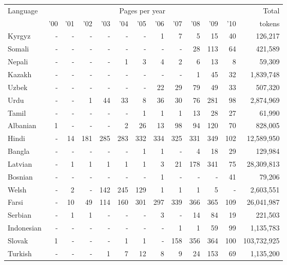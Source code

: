 \documentclass{article}
\begin{document}
\begin{table}[h!]
\setlength{\tabcolsep}{1ex}
\footnotesize
\begin{center}
\begin{tabular}{lrrrrrrrrrrrr}
Language		&	\multicolumn{11}{c}{Pages per year}	&	Total\\
\cline{2-12}
	&	'00	&	'01	&	'02		&	'03	&	'04		&	'05		&	'06	&	'07	&	'08	&	'09	&	'10	&	tokens\\
\hline
Kyrgyz	&	-	&	-	&	-	&	-	&	-	&	-	&	1	&	7	&	5	&	15	&	40	&	126,217\\
Somali	&	-	&	-	&	-	&	-	&	-	&	-	&	-	&	-	&	28	&	113	&	64	&	421,589\\
Nepali	&	-	&	-	&	-	&	-	&	1	&	3	&	4	&	2	&	6	&	13	&	8	&	59,309\\
Kazakh	&	-	&	-	&	-	&	-	&	-	&	-	&	-	&	-	&	1	&	45	&	32	&	1,839,748\\
Uzbek	&	-	&	-	&	-	&	-	&	-	&	-	&	22	&	29	&	79	&	49	&	33	&	507,320\\
Urdu	&	-	&	-	&	1	&	44	&	33	&	8	&	36	&	30	&	76	&	281	&	98	&	2,874,969\\
Tamil	&	-	&	-	&	-	&	-	&	-	&	1	&	1	&	1	&	13	&	28	&	27	&	61,990\\
Albanian	&	1	&	-	&	-	&	-	&	2	&	26	&	13	&	98	&	94	&	120	&	70	&	828,005\\
Hindi	&	-	&	14	&	181	&	285	&	283	&	332	&	334	&	325	&	331	&	349	&	102	&	12,589,950\\
Bangla	&	-	&	-	&	-	&	-	&	-	&	1	&	1	&	-	&	4	&	18	&	29	&	129,984\\
Latvian	&	-	&	1	&	1	&	1	&	1	&	1	&	3	&	21	&	178	&	341	&	75	&	28,309,813\\
Bosnian	&	-	&	-	&	-	&	-	&	-	&	-	&	1	&	-	&	-	&	-	&	41	&	79,206\\
Welsh	&	-	&	2	&	-	&	142	&	245	&	129	&	1	&	1	&	1	&	5	&	-	&	2,603,551\\
Farsi	&	-	&	10	&	49	&	114	&	160	&	301	&	297	&	339	&	366	&	365	&	109	&	26,041,987\\
Serbian	&	-	&	1	&	1	&	-	&	-	&	-	&	3	&	-	&	14	&	84	&	19	&	221,503\\
Indonesian	&	-	&	-	&	-	&	-	&	-	&	-	&	-	&	1	&	1	&	59	&	99	&	1,135,783\\
Slovak	&	1	&	-	&	-	&	-	&	1	&	1	&	-	&	158	&	356	&	364	&	100	&	103,732,925\\
Turkish	&	-	&	-	&	-	&	1	&	7	&	12	&	8	&	9	&	24	&	153	&	69	&	1,135,200\\

\end{tabular}
\end{center}
\end{table}
\end{document}
